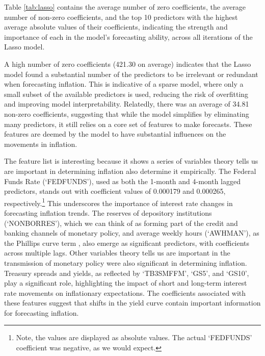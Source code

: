 Table \ref{tab:lasso} contains the average number of zero coefficients, the average number of non-zero coefficients, and the top 10 predictors with the highest average absolute values of their coefficients, indicating the strength and importance of each in the model's forecasting ability, across all iterations of the Lasso model.

A high number of zero coefficients (421.30 on average) indicates that the Lasso model found a substantial number of the predictors to be irrelevant or redundant when forecasting inflation. This is indicative of a sparse model, where only a small subset of the available predictors is used, reducing the risk of overfitting and improving model interpretability. Relatedly, there was an average of 34.81 non-zero coefficients, suggesting that while the model simplifies by eliminating many predictors, it still relies on a core set of features to make forecasts. These features are deemed by the model to have substantial influences on the movements in inflation.

The feature list is interesting because it shows a series of variables theory tells us are important in determining inflation also determine it empirically. The Federal Funds Rate (`FEDFUNDS'), used as both the 1-month and 4-month lagged predictors, stands out with coefficient values of 0.000179 and 0.000265, respectively.\footnote{Note, the values are displayed as absolute values. The actual `FEDFUNDS' coefficient was negative, as we would expect.} This underscores the importance of interest rate changes in forecasting inflation trends. The reserves of depository institutions (`NONBORRES'), which we can think of as forming part of the credit and banking channels of monetary policy, and average weekly hours (`AWHMAN'), as the Phillips curve term \autocite{Phillips1958The186119571}, also emerge as significant predictors, with coefficients across multiple lags. Other variables theory tells us are important in the transmission of monetary policy were also significant in determining inflation. Treasury spreads and yields, as reflected by `TB3SMFFM', `GS5', and `GS10', play a significant role, highlighting the impact of short and long-term interest rate movements on inflationary expectations. The coefficients associated with these features suggest that shifts in the yield curve contain important information for forecasting inflation.


